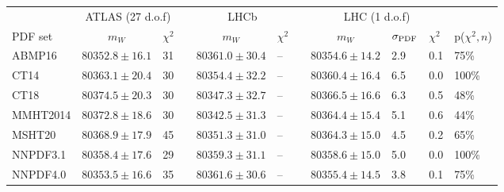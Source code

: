 \begin{tabular*}{\linewidth}{l @{\extracolsep{\fill}}llllllllll}
\hline \hline
           &   \multicolumn{2}{c}{ATLAS (27 d.o.f)} & & \multicolumn{2}{c}{LHCb} & & \multicolumn{3}{c}{LHC (1 d.o.f)} \\
PDF set    & \multicolumn{1}{c}{$m_W$}  & $\chi^2$ & & \multicolumn{1}{c}{$m_W$} & $\chi^2$ & & \multicolumn{1}{c}{$m_W$} & $\sigma_{\scriptsize\textrm{PDF}}$ & $\chi^2$ & p($\chi^2,n$) \\
\hline 
    ABMP16 & $80352.8 \pm 16.1$ & 31 & & $80361.0 \pm 30.4$ & --  & & $80354.6 \pm 14.2$ &    2.9 &    0.1 & 75\% \\
      CT14 & $80363.1 \pm 20.4$ & 30 & & $80354.4 \pm 32.2$ & --  & & $80360.4 \pm 16.4$ &    6.5 &    0.0 & 100\% \\
      CT18 & $80374.5 \pm 20.3$ & 30 & & $80347.3 \pm 32.7$ & --  & & $80366.5 \pm 16.6$ &    6.3 &    0.5 & 48\% \\
  MMHT2014 & $80372.8 \pm 18.6$ & 30 & & $80342.5 \pm 31.3$ & --  & & $80364.4 \pm 15.4$ &    5.1 &    0.6 & 44\% \\
    MSHT20 & $80368.9 \pm 17.9$ & 45 & & $80351.3 \pm 31.0$ & --  & & $80364.3 \pm 15.0$ &    4.5 &    0.2 & 65\% \\
  NNPDF3.1 & $80358.4 \pm 17.6$ & 29 & & $80359.3 \pm 31.1$ & --  & & $80358.6 \pm 15.0$ &    5.0 &    0.0 & 100\% \\
  NNPDF4.0 & $80353.5 \pm 16.6$ & 35 & & $80361.6 \pm 30.6$ & --  & & $80355.4 \pm 14.5$ &    3.8 &    0.1 & 75\% \\
\hline \hline
\end{tabular*}

